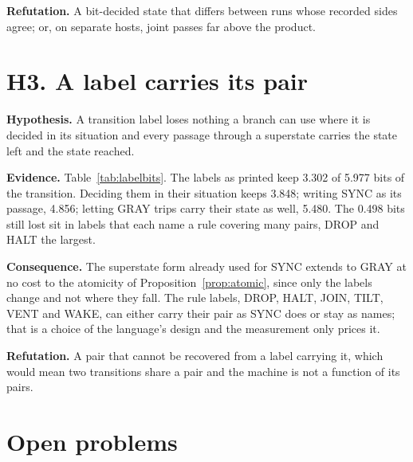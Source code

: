 \textbf{Refutation.} A bit-decided state that differs between runs whose recorded sides agree;
or, on separate hosts, joint passes far above the product.

\section{H3. A label carries its pair}
\label{sec:h3}

\textbf{Hypothesis.} A transition label loses nothing a branch can use where it is decided in its
situation and every passage through a superstate carries the state left and the state reached.

\textbf{Evidence.} Table~\ref{tab:labelbits}. The labels as printed keep 3.302 of 5.977 bits of
the transition. Deciding them in their situation keeps 3.848; writing SYNC as its passage, 4.856;
letting GRAY trips carry their state as well, 5.480. The 0.498 bits still lost sit in labels
that each name a rule covering many pairs, DROP and HALT the largest.

\textbf{Consequence.} The superstate form already used for SYNC extends to GRAY at no cost to the
atomicity of Proposition~\ref{prop:atomic}, since only the labels change and not where they fall.
The rule labels, DROP, HALT, JOIN, TILT, VENT and WAKE, can either carry their pair as SYNC does or
stay as names; that is a choice of the language's design and the measurement only prices it.

\textbf{Refutation.} A pair that cannot be recovered from a label carrying it, which would mean
two transitions share a pair and the machine is not a function of its pairs.

\section{Open problems}

